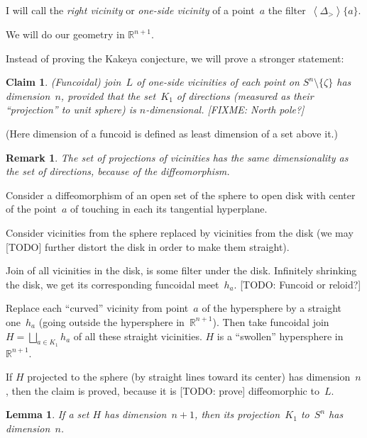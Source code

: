 \documentclass{amsart}
\newcommand{\supfun}[1]{\left\langle#1\right\rangle}
\newenvironment{del}{\color{gray}}{}
\newtheorem{lem}{Lemma}
\newtheorem{claim}{Claim}
\newtheorem{rem}{Remark}
\begin{document}
I will call the \emph{right vicinity} or \emph{one-si\-de vicinity} of a point~$a$ the filter~$\supfun{\Delta_{>}}\{a\}$.

We will do our geometry in $\mathbb{R}^{n+1}$.

Instead of proving the Kakeya conjecture, we will prove a stronger statement:

\begin{claim}
(Funcoidal) join~$L$ of one-si\-de vicinities of each point on $S^n\setminus\{\zeta\}$ has dimension~$n$, provided that the set~$K_1$ of directions (measured as their ``projection'' to unit sphere) is $n$-di\-men\-sio\-nal. [FIXME: North pole?]
\end{claim}

(Here dimension of a funcoid is defined as least dimension of a set above it.)

\begin{rem}
The set of projections of vicinities has the same dimensionality as the set of directions, because of the diffeomorphism.
\end{rem}

\begin{del}
Consider a diffeomorphism of an open set of the sphere to open disk with center of the point~$a$ of touching in each its tangential hyperplane.

Consider vicinities from the sphere replaced by vicinities from the disk (we may [TODO] further distort the disk in order to make them straight).

Join of all vicinities in the disk, is some filter under the disk. Infinitely shrinking the disk, we get its corresponding funcoidal meet~$h_a$. [TODO: Funcoid or reloid?]
\end{del}

Replace each ``curved'' vicinity from point~$a$ of the hypersphere by a straight one~$h_a$ (going outside the hypersphere in~$\mathbb{R}^{n+1}$). Then take funcoidal join $H=\bigsqcup_{a\in K_1}h_a$ of all these straight vicinities. $H$ is a ``swollen'' hypersphere in $\mathbb{R}^{n+1}$.

If $H$ projected to the sphere (by straight lines toward its center) has dimension~$n$, then the claim is proved, because it is [TODO: prove] diffeomorphic to~$L$.

\begin{lem}
If a set $H$ has dimension~$n+1$, then its projection~$K_1$ to~$S^n$ has dimension~$n$.
\end{lem}
\end{document}
